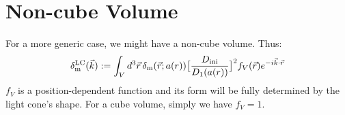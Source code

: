 \documentclass[prd,amsmath,amssymb,floatfix,superscriptaddress,nofootinbib,twocolumn]{revtex4-1}
\def\be{\begin{equation}}
\def\ee{\end{equation}}
\newcommand{\LC}{\rm LC}
\newcommand{\ini}{\rm ini}
\newcommand{\vrr}{\vec{r}}
\newcommand{\vk}{\vec{k}}
\begin{document}
\appendix

\section{Non-cube Volume}
For a more generic case, we might have a non-cube volume. Thus:
\be
\delta^{\LC}_{\rm m}(\vk) :=\int_{V} d^3\vrr  \, \delta_{\rm m}(\vrr;a(r))\big[ \frac{D_{\ini}}{D_{1}(a(r))} \big]^{2}f_{V}(\vrr) e^{-i\vk \cdot\vrr}
\ee
 $f_{V}$ is a position-dependent function and its form will be fully determined by the light cone's shape. For a cube volume, simply we have $f_V=1$.
\end{document}
